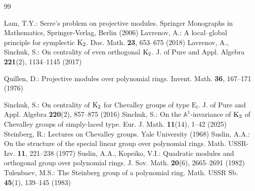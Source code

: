 \documentclass[11pt]{amsart}
\theoremstyle{definition}
\numberwithin{equation}{section}
\numberwithin{equation}{section}
\newcommand{\E}{\mathrm{E}}
\newcommand{\<}{\langle}
\renewcommand{\>}{\rangle}
\newcommand{\K}{{\operatorname{\rm K}}}
\begin{document}
\begin{thebibliography}{99}

Lam, T.Y.: Serre's problem on projective modules. Springer Monographs in Mathematics, Springer-Verlag, Berlin (2006)
Lavrenov, A.: A local–global principle for symplectic $\K_{2}$. Doc. Math. {\bf 23}, 653--675 (2018)
Lavrenov, A., Sinchuk, S.: On centrality of even orthogonal $\K_{2}$. J. of Pure and Appl. Algebra {\bf 221}(2), 1134--1145 (2017)

Quillen, D.: Projective modules over polynomial rings. Invent. Math. {\bf 36}, 167--171 (1976)


Sinchuk, S.: On centrality of $\K_{2}$ for Chevalley groups of type $\E_{l}$. J. of Pure and Appl. Algebra {\bf 220}(2), 857--875 (2016)
Sinchuk, S.: On the $\mathbb{A}^{1}$-invariance of $\K_{2}$ of Chevalley groups of simply-laced type. Eur. J. Math. {\bf 11}(14), 1--42 (2025)
Steinberg, R.: Lectures on Chevalley groups. Yale University (1968)
Suslin, A.A.: On the structure of the special linear group over polynomial rings. Math. USSR-Izv. {\bf 11}, 221--238 (1977)
Suslin, A.A., Kopeiko, V.I.: Quadratic modules and orthogonal group over polynomial rings. J. Sov. Math. {\bf 20}(6), 2665--2691 (1982)
Tulenbaev, M.S.: The Steinberg group of a polynomial ring. Math. USSR Sb. {\bf 45}(1), 139--145 (1983)


\end{thebibliography}
\end{document}
